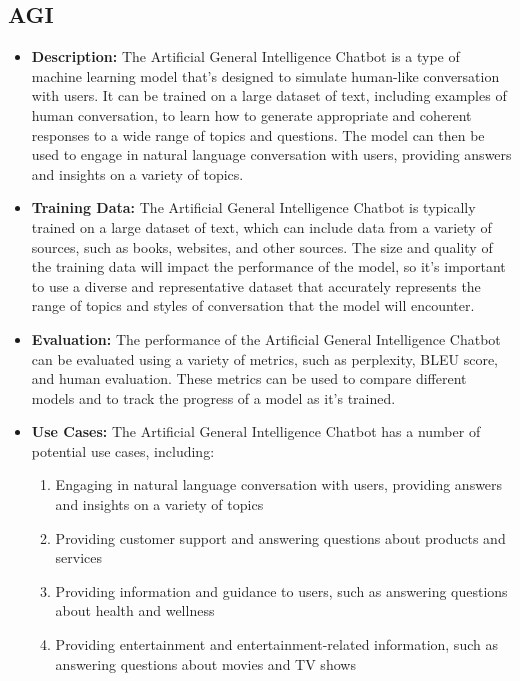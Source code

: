 \subsection{AGI}

\begin{itemize}
    \item \textbf{Description:} The Artificial General Intelligence Chatbot is a type of machine learning model that's designed to simulate human-like conversation with users. It can be trained on a large dataset of text, including examples of human conversation, to learn how to generate appropriate and coherent responses to a wide range of topics and questions. The model can then be used to engage in natural language conversation with users, providing answers and insights on a variety of topics.
    \item \textbf{Training Data:} The Artificial General Intelligence Chatbot is typically trained on a large dataset of text, which can include data from a variety of sources, such as books, websites, and other sources. The size and quality of the training data will impact the performance of the model, so it's important to use a diverse and representative dataset that accurately represents the range of topics and styles of conversation that the model will encounter.
    \item \textbf{Evaluation:} The performance of the Artificial General Intelligence Chatbot can be evaluated using a variety of metrics, such as perplexity, BLEU score, and human evaluation. These metrics can be used to compare different models and to track the progress of a model as it's trained.
    \item \textbf{Use Cases:} The Artificial General Intelligence Chatbot has a number of potential use cases, including:
        \begin{enumerate}  
            \item Engaging in natural language conversation with users, providing answers and insights on a variety of topics
            \item Providing customer support and answering questions about products and services
            \item Providing information and guidance to users, such as answering questions about health and wellness
            \item Providing entertainment and entertainment-related information, such as answering questions about movies and TV shows
        \end{enumerate}
\begin{marginfigure}[-5.5cm]

\end{marginfigure}
\end{itemize}
